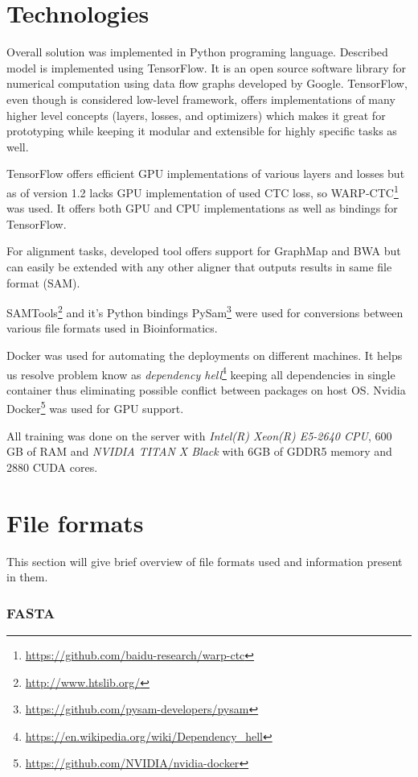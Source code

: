 \documentclass[times, utf8, diplomski, numeric, english]{fer}
\begin{document}
\section{Technologies}

Overall solution was implemented in Python programing language. Described model is implemented using TensorFlow. It is an open source software library for numerical computation using data flow graphs developed by Google. TensorFlow, even though is considered low-level framework, offers implementations of many higher level concepts (layers, losses, and optimizers) which makes it great for prototyping while keeping it modular and extensible for highly specific tasks as well.

TensorFlow offers efficient GPU implementations of various layers and losses but as of version 1.2 lacks GPU implementation of used CTC loss, so WARP-CTC\footnote{\url{https://github.com/baidu-research/warp-ctc}} was used. It offers both GPU and CPU implementations as well as bindings for TensorFlow.

For alignment tasks, developed tool offers support for GraphMap and BWA but can easily be extended with any other aligner that outputs results in same file format (SAM).

SAMTools\footnote{\url{http://www.htslib.org/}} and it's Python bindings PySam\footnote{\url{https://github.com/pysam-developers/pysam}} were used for conversions between various file formats used in Bioinformatics.

Docker was used for automating the deployments on different machines. It helps us resolve problem know as \textit{dependency hell}\footnote{\url{https://en.wikipedia.org/wiki/Dependency_hell}}  keeping all dependencies in single container thus eliminating possible conflict between packages on host OS.
Nvidia Docker\footnote{\url{https://github.com/NVIDIA/nvidia-docker}} was used for GPU support.


All training was done on the server with  \textit{Intel(R) Xeon(R) E5-2640 CPU}, 600 GB of RAM and \textit{NVIDIA TITAN X Black} with 6GB of GDDR5 memory and 2880 CUDA cores.


\section{File formats}
This section will give brief overview of file formats used and information present in them.
\subsubsection{FASTA}
\end{document}
